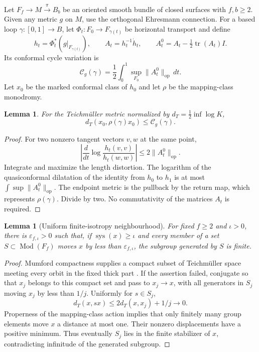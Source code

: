 \documentclass[11pt,a4paper]{article}
\newtheorem{lemma}[theorem]{Lemma}
\theoremstyle{definition}\newtheorem{definition}[theorem]{Definition}
\theoremstyle{remark}\newtheorem{remark}[theorem]{Remark}
\DeclareMathOperator{\tr}{tr}
\DeclareMathOperator{\sys}{sys}
\DeclareMathOperator{\Mod}{Mod}
\newcommand{\op}{\mathrm{op}}
\begin{document}
Let $F_f\to M\xrightarrow{\pi}B_b$ be an oriented smooth bundle of closed surfaces with $f,b\ge2$. Given any metric $g$ on $M$, use the orthogonal Ehresmann connection. For a based loop $\gamma:[0,1]\to B$, let $\Phi_t:F_0\to F_{\gamma(t)}$ be horizontal transport and define
\[
 h_t=\Phi_t^*(g|_{F_{\gamma(t)}}),\qquad
 A_t=h_t^{-1}\dot h_t,\qquad
 A_t^0=A_t-\tfrac12\tr(A_t)I.
\]
Its conformal cycle variation is
\begin{equation}\label{eq:cycle}
 \mathcal C_g(\gamma)=\frac12\int_0^1
               \sup_{F_0}\|A_t^0\|_\op\,dt.
\end{equation}
Let $x_0$ be the marked conformal class of $h_0$ and let $\rho$ be the mapping-class monodromy.

\begin{lemma}\label{lem:displacement}
For the Teichm\"uller metric normalized by $d_T=\tfrac12\inf\log K$,
\[
 d_T(x_0,\rho(\gamma)x_0)\le\mathcal C_g(\gamma).
\]
\end{lemma}
\begin{proof}
For two nonzero tangent vectors $v,w$ at the same point,
\[
 \left|\frac d{dt}\log\frac{h_t(v,v)}{h_t(w,w)}\right|
                          \le2\|A_t^0\|_\op.
\]
Integrate and maximize the length distortion. The logarithm of the quasiconformal dilatation of the identity from $h_0$ to $h_1$ is at most $\int\sup\|A_t^0\|_\op$. The endpoint metric is the pullback by the return map, which represents $\rho(\gamma)$. Divide by two. No commutativity of the matrices $A_t$ is required.
\end{proof}

\begin{lemma}[Uniform finite-isotropy neighbourhood]\label{lem:thick}
For fixed $f\ge2$ and $\iota>0$, there is $\varepsilon_{f,\iota}>0$ such that, if $\sys(x)\ge\iota$ and every member of a set $S\subset\Mod(F_f)$ moves $x$ by less than $\varepsilon_{f,\iota}$, the subgroup generated by $S$ is finite.
\end{lemma}
\begin{proof}
Mumford compactness supplies a compact subset of Teichm\"uller space meeting every orbit in the fixed thick part \cite{Mumford}. If the assertion failed, conjugate so that $x_j$ belongs to this compact set and pass to $x_j\to x$, with all generators in $S_j$ moving $x_j$ by less than $1/j$. Uniformly for $s\in S_j$,
\[
 d_T(x,sx)\le2d_T(x,x_j)+1/j\longrightarrow0.
\]
Properness of the mapping-class action implies that only finitely many group elements move $x$ a distance at most one. Their nonzero displacements have a positive minimum. Thus eventually $S_j$ lies in the finite stabilizer of $x$, contradicting infinitude of the generated subgroup.
\end{proof}
\end{document}
